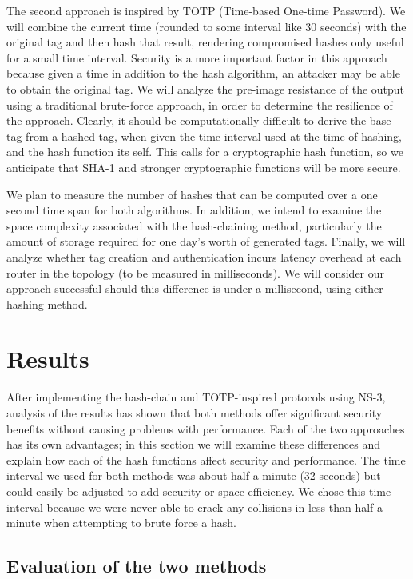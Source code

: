\documentclass[12pt]{article} %
\begin{document}
The second approach is inspired by TOTP (Time-based One-time Password). We will combine the current time (rounded to some interval like 30 seconds) with the original tag and then hash that result, rendering compromised hashes only useful for a small time interval. Security is a more important factor in this approach because given a time in addition to the hash algorithm, an attacker may be able to obtain the original tag. We will analyze the pre-image resistance of the output using a traditional brute-force approach, in order to determine the resilience of the approach. Clearly, it should be computationally difficult to derive the base tag from a hashed tag, when given the time interval used at the time of hashing, and the hash function its self. This calls for a cryptographic hash function, so we anticipate that SHA-1 and stronger cryptographic functions will be more secure. 

We plan to measure the number of hashes that can be computed over a one second time span for both algorithms. In addition, we intend to examine the space complexity associated with the hash-chaining method, particularly the amount of storage required for one day's worth of generated tags. Finally, we will analyze whether tag creation and authentication incurs latency overhead at each router in the topology (to be measured in milliseconds). We will consider our approach successful should this difference is under a millisecond, using either hashing method.

\section{Results}

After implementing the hash-chain and TOTP-inspired protocols using NS-3, analysis of the results has shown that both methods offer significant security benefits without causing problems with performance. Each of the two approaches has its own advantages; in this section we will examine these differences and explain how each of the hash functions affect security and performance. The time interval we used for both methods was about half a minute (32 seconds) but could easily be adjusted to add security or space-efficiency. We chose this time interval because we were never able to crack any collisions in less than half a minute when attempting to brute force a hash. 

\subsection{Evaluation of the two methods}
\end{document}
